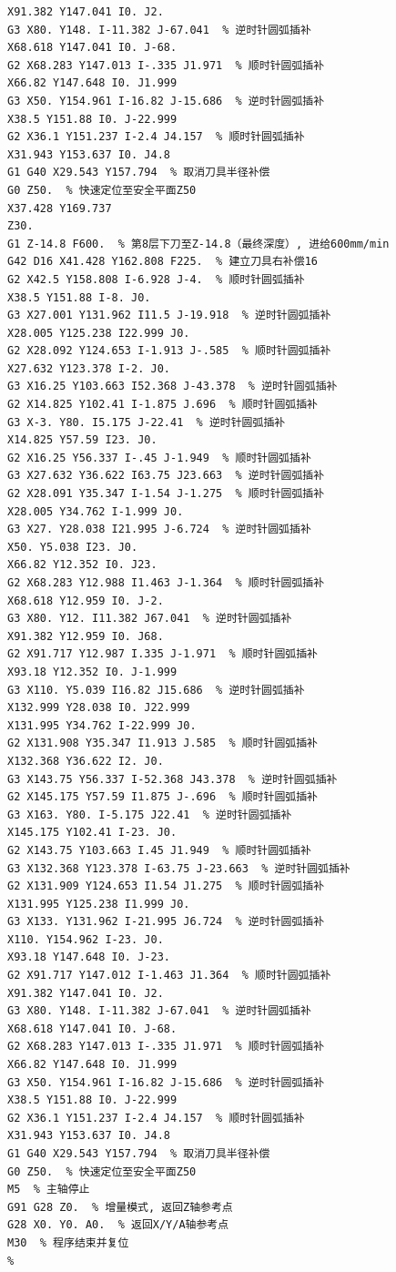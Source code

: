\documentclass{xautCADreport}
\begin{document}
\begin{lstlisting}[language={}, title={工序50-凸模.nc（完整程序）}, basicstyle=\ttfamily\tiny]
X91.382 Y147.041 I0. J2.
G3 X80. Y148. I-11.382 J-67.041  % 逆时针圆弧插补
X68.618 Y147.041 I0. J-68.
G2 X68.283 Y147.013 I-.335 J1.971  % 顺时针圆弧插补
X66.82 Y147.648 I0. J1.999
G3 X50. Y154.961 I-16.82 J-15.686  % 逆时针圆弧插补
X38.5 Y151.88 I0. J-22.999
G2 X36.1 Y151.237 I-2.4 J4.157  % 顺时针圆弧插补
X31.943 Y153.637 I0. J4.8
G1 G40 X29.543 Y157.794  % 取消刀具半径补偿
G0 Z50.  % 快速定位至安全平面Z50
X37.428 Y169.737
Z30.
G1 Z-14.8 F600.  % 第8层下刀至Z-14.8（最终深度）, 进给600mm/min
G42 D16 X41.428 Y162.808 F225.  % 建立刀具右补偿16
G2 X42.5 Y158.808 I-6.928 J-4.  % 顺时针圆弧插补
X38.5 Y151.88 I-8. J0.
G3 X27.001 Y131.962 I11.5 J-19.918  % 逆时针圆弧插补
X28.005 Y125.238 I22.999 J0.
G2 X28.092 Y124.653 I-1.913 J-.585  % 顺时针圆弧插补
X27.632 Y123.378 I-2. J0.
G3 X16.25 Y103.663 I52.368 J-43.378  % 逆时针圆弧插补
G2 X14.825 Y102.41 I-1.875 J.696  % 顺时针圆弧插补
G3 X-3. Y80. I5.175 J-22.41  % 逆时针圆弧插补
X14.825 Y57.59 I23. J0.
G2 X16.25 Y56.337 I-.45 J-1.949  % 顺时针圆弧插补
G3 X27.632 Y36.622 I63.75 J23.663  % 逆时针圆弧插补
G2 X28.091 Y35.347 I-1.54 J-1.275  % 顺时针圆弧插补
X28.005 Y34.762 I-1.999 J0.
G3 X27. Y28.038 I21.995 J-6.724  % 逆时针圆弧插补
X50. Y5.038 I23. J0.
X66.82 Y12.352 I0. J23.
G2 X68.283 Y12.988 I1.463 J-1.364  % 顺时针圆弧插补
X68.618 Y12.959 I0. J-2.
G3 X80. Y12. I11.382 J67.041  % 逆时针圆弧插补
X91.382 Y12.959 I0. J68.
G2 X91.717 Y12.987 I.335 J-1.971  % 顺时针圆弧插补
X93.18 Y12.352 I0. J-1.999
G3 X110. Y5.039 I16.82 J15.686  % 逆时针圆弧插补
X132.999 Y28.038 I0. J22.999
X131.995 Y34.762 I-22.999 J0.
G2 X131.908 Y35.347 I1.913 J.585  % 顺时针圆弧插补
X132.368 Y36.622 I2. J0.
G3 X143.75 Y56.337 I-52.368 J43.378  % 逆时针圆弧插补
G2 X145.175 Y57.59 I1.875 J-.696  % 顺时针圆弧插补
G3 X163. Y80. I-5.175 J22.41  % 逆时针圆弧插补
X145.175 Y102.41 I-23. J0.
G2 X143.75 Y103.663 I.45 J1.949  % 顺时针圆弧插补
G3 X132.368 Y123.378 I-63.75 J-23.663  % 逆时针圆弧插补
G2 X131.909 Y124.653 I1.54 J1.275  % 顺时针圆弧插补
X131.995 Y125.238 I1.999 J0.
G3 X133. Y131.962 I-21.995 J6.724  % 逆时针圆弧插补
X110. Y154.962 I-23. J0.
X93.18 Y147.648 I0. J-23.
G2 X91.717 Y147.012 I-1.463 J1.364  % 顺时针圆弧插补
X91.382 Y147.041 I0. J2.
G3 X80. Y148. I-11.382 J-67.041  % 逆时针圆弧插补
X68.618 Y147.041 I0. J-68.
G2 X68.283 Y147.013 I-.335 J1.971  % 顺时针圆弧插补
X66.82 Y147.648 I0. J1.999
G3 X50. Y154.961 I-16.82 J-15.686  % 逆时针圆弧插补
X38.5 Y151.88 I0. J-22.999
G2 X36.1 Y151.237 I-2.4 J4.157  % 顺时针圆弧插补
X31.943 Y153.637 I0. J4.8
G1 G40 X29.543 Y157.794  % 取消刀具半径补偿
G0 Z50.  % 快速定位至安全平面Z50
M5  % 主轴停止
G91 G28 Z0.  % 增量模式, 返回Z轴参考点
G28 X0. Y0. A0.  % 返回X/Y/A轴参考点
M30  % 程序结束并复位
%
\end{lstlisting}
\end{document}
